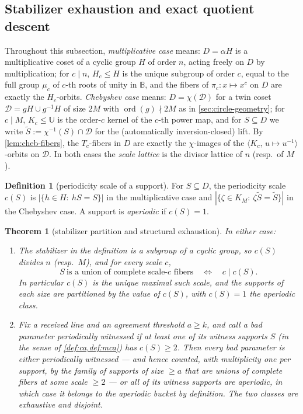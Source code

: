 \documentclass[11pt]{article}
\newtheorem{theorem}{Theorem}[section]
\theoremstyle{definition}
\newtheorem{definition}[definition]{Definition}
\theoremstyle{remark}
\newcommand{\B}{\mathbb{B}}
\newcommand{\UU}{\mathbb{U}}
\begin{document}
\subsection{Stabilizer exhaustion and exact quotient descent}\label{sec:discharge-T1}

Throughout this subsection, \emph{multiplicative case} means: $D=\alpha H$ is a multiplicative coset of a cyclic group $H$ of order $n$, acting freely on $D$ by multiplication; for $c\mid n$, $H_c\le H$ is the unique subgroup of order $c$, equal to the full group $\mu_c$ of $c$-th roots of unity in $\B$, and the fibers of $\pi_c:x\mapsto x^c$ on $D$ are exactly the $H_c$-orbits. \emph{Chebyshev case} means: $D=\chi(\mathcal D)$ for a twin coset $\mathcal D=gH\cup g^{-1}H$ of size $2M$ with $\operatorname{ord}(g)\nmid2M$ as in \cref{sec:circle-geometry}; for $c\mid M$, $K_c\le\UU$ is the order-$c$ kernel of the $c$-th power map, and for $S\subseteq D$ we write $\widetilde S:=\chi^{-1}(S)\cap\mathcal D$ for the (automatically inversion-closed) lift. By \cref{lem:cheb-fibers}, the $T_c$-fibers in $D$ are exactly the $\chi$-images of the $\langle K_c,\,u\mapsto u^{-1}\rangle$-orbits on $\mathcal D$. In both cases the \emph{scale lattice} is the divisor lattice of $n$ (resp.\ of $M$).

\begin{definition}[periodicity scale of a support]\label{def:periodicity-scale}
For $S\subseteq D$, the periodicity scale $c(S)$ is $|\{h\in H:\ hS=S\}|$ in the multiplicative case and $|\{\zeta\in K_M:\ \zeta\widetilde S=\widetilde S\}|$ in the Chebyshev case. A support is \emph{aperiodic} if $c(S)=1$.
\end{definition}

\begin{theorem}[stabilizer partition and structural exhaustion]\label{thm:stabilizer-partition}
In either case:
\begin{enumerate}[label=\textup{(\roman*)}]
\item The stabilizer in the definition is a subgroup of a cyclic group, so $c(S)$ divides $n$ \textup(resp.\ $M$\textup), and for every scale $c$,
\[
S\ \text{is a union of complete scale-$c$ fibers}
\quad\Longleftrightarrow\quad
c\mid c(S).
\]
In particular $c(S)$ is the unique maximal such scale, and the supports of each size are partitioned by the value of $c(S)$, with $c(S)=1$ the aperiodic class.
\item Fix a received line and an agreement threshold $a\ge k$, and call a bad parameter \emph{periodically witnessed} if at least one of its witness supports $S$ \textup(in the sense of \cref{def:ca,def:mca}\textup) has $c(S)\ge2$. Then every bad parameter is either periodically witnessed --- and hence counted, with multiplicity one per support, by the family of supports of size $\ge a$ that are unions of complete fibers at some scale $\ge2$ --- or all of its witness supports are aperiodic, in which case it belongs to the aperiodic bucket by definition. The two classes are exhaustive and disjoint.
\end{enumerate}
\end{theorem}
\end{document}
